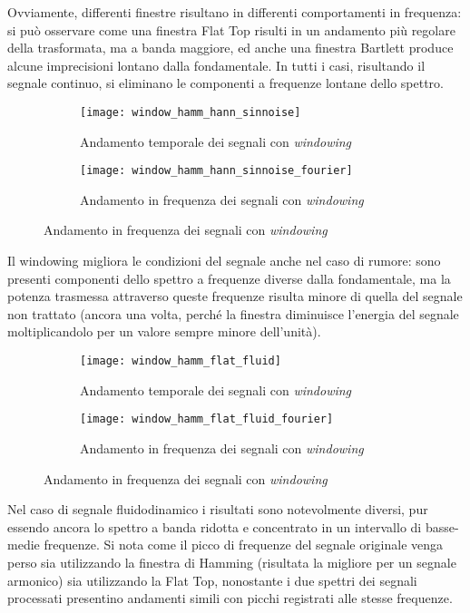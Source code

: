 \documentclass{article} %
\begin{document}
Ovviamente, differenti finestre risultano in differenti comportamenti in frequenza: si può osservare come una finestra Flat Top risulti in un andamento più regolare della trasformata, ma a banda maggiore, ed anche una finestra Bartlett produce alcune imprecisioni lontano dalla fondamentale. In tutti i casi, risultando il segnale continuo, si eliminano le componenti a frequenze lontane dello spettro.
\begin{figure}[h!]
	\begin{subfigure}{0.5\textwidth}
		\texttt{[image: window\_hamm\_hann\_sinnoise]}
		\caption{Andamento temporale dei segnali con \textit{windowing}}
	\end{subfigure}
	\begin{subfigure}{0.5\textwidth}
		\texttt{[image: window\_hamm\_hann\_sinnoise\_fourier]}
		\caption{Andamento in frequenza dei segnali con \textit{windowing}}
	\end{subfigure}
\end{figure}\par
Il windowing migliora le condizioni del segnale anche nel caso di rumore: sono presenti componenti dello spettro a frequenze diverse dalla fondamentale, ma la potenza trasmessa attraverso queste frequenze risulta minore di quella del segnale non trattato (ancora una volta, perché la finestra diminuisce l'energia del segnale moltiplicandolo per un valore sempre minore dell'unità).
\begin{figure}[h!]
	\begin{subfigure}{0.5\textwidth}
		\texttt{[image: window\_hamm\_flat\_fluid]}
		\caption{Andamento temporale dei segnali con \textit{windowing}}
	\end{subfigure}
	\begin{subfigure}{0.5\textwidth}
		\texttt{[image: window\_hamm\_flat\_fluid\_fourier]}
		\caption{Andamento in frequenza dei segnali con \textit{windowing}}
	\end{subfigure}
\end{figure}\par
Nel caso di segnale fluidodinamico i risultati sono notevolmente diversi, pur essendo ancora lo spettro a banda ridotta e concentrato in un intervallo di basse-medie frequenze. Si nota come il picco di frequenze del segnale originale venga perso sia utilizzando la finestra di Hamming (risultata la migliore per un segnale armonico) sia utilizzando la Flat Top, nonostante i due spettri dei segnali processati presentino andamenti simili con picchi registrati alle stesse frequenze.
\newpage
\end{document}
